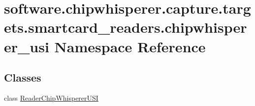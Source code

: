 \hypertarget{namespacesoftware_1_1chipwhisperer_1_1capture_1_1targets_1_1smartcard__readers_1_1chipwhisperer__usi}{}\section{software.\+chipwhisperer.\+capture.\+targets.\+smartcard\+\_\+readers.\+chipwhisperer\+\_\+usi Namespace Reference}
\label{namespacesoftware_1_1chipwhisperer_1_1capture_1_1targets_1_1smartcard__readers_1_1chipwhisperer__usi}
\subsection*{Classes}
\begin{DoxyCompactItemize}
\item 
class \hyperlink{classsoftware_1_1chipwhisperer_1_1capture_1_1targets_1_1smartcard__readers_1_1chipwhisperer__usi_1_1ReaderChipWhispererUSI}{Reader\+Chip\+Whisperer\+U\+S\+I}
\end{DoxyCompactItemize}
